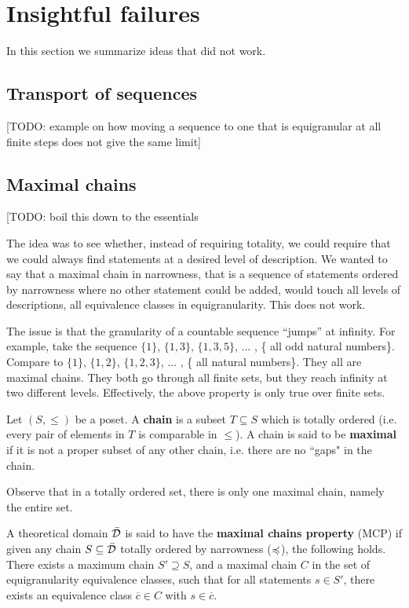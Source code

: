 \documentclass[10pt, onecolumn, nofootinbib]{revtex4-2}
\begin{document}
\section{Insightful failures}

In this section we summarize ideas that did not work.

\subsection{Transport of sequences}

[TODO: example on how moving a sequence to one that is equigranular at all finite steps does not give the same limit]

\subsection{Maximal chains}
[TODO: boil this down to the essentials

The idea was to see whether, instead of requiring totality, we could require that we could always find statements at a desired level of description. We wanted to say that a maximal chain in narrowness, that is a sequence of statements ordered by narrowness where no other statement could be added, would touch all levels of descriptions, all equivalence classes in equigranularity. This does not work.

The issue is that the granularity of a countable sequence ``jumps'' at infinity. For example, take the sequence $\{1\}$, $\{1, 3\}$, $\{1, 3, 5\}$, ... , \{ all odd natural numbers\}. Compare to $\{1\}$, $\{1, 2\}$, $\{1, 2, 3\}$, ... , \{ all natural numbers\}. They all are maximal chains. They both go through all finite sets, but they reach infinity at two different levels. Effectively, the above property is only true over finite sets.

\begin{defn}
Let $(S,\leq)$ be a poset. A \textbf{chain} is a subset $T\subseteq S$ which is totally ordered (i.e. every pair of elements in $T$ is comparable in $\leq$). A chain is said to be \textbf{maximal} if it is not a proper subset of any other chain, i.e. there are no ``gaps" in the chain. 
\end{defn}
Observe that in a totally ordered set, there is only one maximal chain, namely the entire set. 

\begin{defn}
A theoretical domain $\bar{\mathcal{D}}$ is said to have the \textbf{maximal chains property} (MCP) if given any chain $S\subseteq\bar{\mathcal{D}}$ totally ordered by narrowness ($\preccurlyeq$), the following holds. There exists a maximum chain $S'\supseteq S$, and a maximal chain $C$ in the set of equigranularity equivalence classes, such that for all statements $s \in S'$, there exists an equivalence class $\overline{c}\in C$ with $s\in \overline{c}$.
\end{defn}
\end{document}
